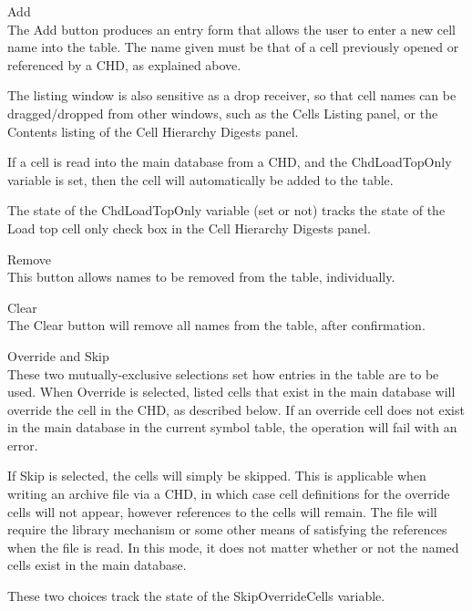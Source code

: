 \begin{description}
\item{\cb Add}\\
The {\cb Add} button produces an entry form that allows the user to
enter a new cell name into the table.  The name given must be that of
a cell previously opened or referenced by a CHD, as explained above.

The listing window is also sensitive as a drop receiver, so that cell
names can be dragged/dropped from other windows, such as the {\cb
Cells Listing} panel, or the {\cb Contents} listing of the {\cb Cell
Hierarchy Digests} panel.

If a cell is read into the main database from a CHD, and the {\et
ChdLoadTopOnly} variable is set, then the cell will automatically be
added to the table.

The state of the {\et ChdLoadTopOnly} variable (set or not) tracks the
state of the {\cb Load top cell only} check box in the {\cb Cell
Hierarchy Digests} panel.

\item{\cb Remove}\\
This button allows names to be removed from the table, individually.

\item{\cb Clear}\\
The {\cb Clear} button will remove all names from the table, after
confirmation.

\item{\cb Override} and {\cb Skip}\\
These two mutually-exclusive selections set how entries in the table
are to be used.  When {\cb Override} is selected, listed cells that
exist in the main database will override the cell in the CHD, as
described below.  If an override cell does not exist in the main
database in the current symbol table, the operation will fail with an
error.

If {\cb Skip} is selected, the cells will simply be skipped.  This is
applicable when writing an archive file via a CHD, in which case cell
definitions for the override cells will not appear, however references
to the cells will remain.  The file will require the library mechanism
or some other means of satisfying the references when the file is
read.  In this mode, it does not matter whether or not the named cells
exist in the main database.

These two choices track the state of the {\et SkipOverrideCells}
variable.
\end{description}

